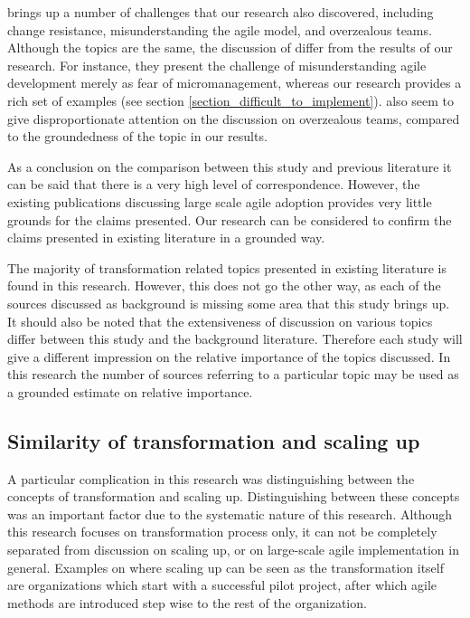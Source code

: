 \citet{Cohn2003} brings up a number of challenges that our research also
discovered, including change resistance, misunderstanding the agile model, and
overzealous teams. Although the topics are the same, the discussion of
\citeauthor{Cohn2003} differ from the results of our research. For instance,
they present the challenge of misunderstanding agile development merely as fear
of micromanagement, whereas our research provides a rich set of examples (see
section \ref{section_difficult_to_implement}).
\citeauthor{Cohn2003} also seem to give disproportionate attention on the
discussion on overzealous teams, compared to the groundedness of the topic
in our results.

As a conclusion on the comparison between this study and previous literature it
can be said that there is a very high level of correspondence. However, the
existing publications discussing large scale agile adoption provides very little
grounds for the claims presented. Our research can be considered to confirm the
claims presented in existing literature in a grounded way.

The majority of transformation related topics presented in existing literature
is found in this research. However, this does not go the other way, as each of
the sources discussed as background is missing some area that this study brings
up.
It should also be noted that the extensiveness of discussion on various topics
differ between this study and the background literature. Therefore each study
will give a different impression on the relative importance of the topics
discussed. In this research the number of sources referring to a particular
topic may be used as a grounded estimate on relative importance.

\subsection{Similarity of transformation and scaling up}

A particular complication in this research was distinguishing between the
concepts of transformation and scaling up. Distinguishing between these concepts
was an important factor due to the systematic nature of this research. Although
this research focuses on transformation process only, it can not be completely
separated from discussion on scaling up, or on large-scale agile implementation
in general.
Examples on where scaling up can be seen as the transformation itself are
organizations which start with a successful pilot project, after which agile
methods are introduced step wise to the rest of the organization.

